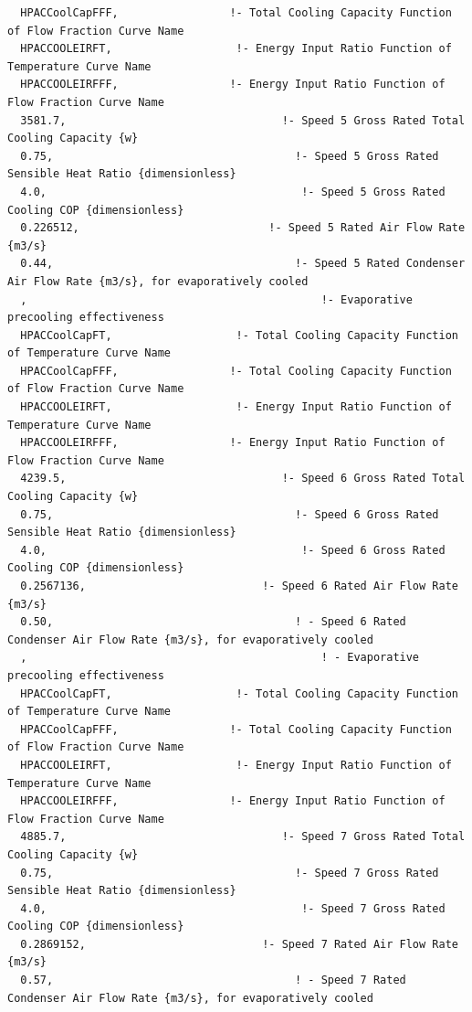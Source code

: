 \begin{lstlisting}
  HPACCoolCapFFF,                 !- Total Cooling Capacity Function of Flow Fraction Curve Name
  HPACCOOLEIRFT,                   !- Energy Input Ratio Function of Temperature Curve Name
  HPACCOOLEIRFFF,                 !- Energy Input Ratio Function of Flow Fraction Curve Name
  3581.7,                                 !- Speed 5 Gross Rated Total Cooling Capacity {w}
  0.75,                                     !- Speed 5 Gross Rated Sensible Heat Ratio {dimensionless}
  4.0,                                       !- Speed 5 Gross Rated Cooling COP {dimensionless}
  0.226512,                             !- Speed 5 Rated Air Flow Rate {m3/s}
  0.44,                                     !- Speed 5 Rated Condenser Air Flow Rate {m3/s}, for evaporatively cooled
  ,                                             !- Evaporative precooling effectiveness
  HPACCoolCapFT,                   !- Total Cooling Capacity Function of Temperature Curve Name
  HPACCoolCapFFF,                 !- Total Cooling Capacity Function of Flow Fraction Curve Name
  HPACCOOLEIRFT,                   !- Energy Input Ratio Function of Temperature Curve Name
  HPACCOOLEIRFFF,                 !- Energy Input Ratio Function of Flow Fraction Curve Name
  4239.5,                                 !- Speed 6 Gross Rated Total Cooling Capacity {w}
  0.75,                                     !- Speed 6 Gross Rated Sensible Heat Ratio {dimensionless}
  4.0,                                       !- Speed 6 Gross Rated Cooling COP {dimensionless}
  0.2567136,                           !- Speed 6 Rated Air Flow Rate {m3/s}
  0.50,                                     ! - Speed 6 Rated Condenser Air Flow Rate {m3/s}, for evaporatively cooled
  ,                                             ! - Evaporative precooling effectiveness
  HPACCoolCapFT,                   !- Total Cooling Capacity Function of Temperature Curve Name
  HPACCoolCapFFF,                 !- Total Cooling Capacity Function of Flow Fraction Curve Name
  HPACCOOLEIRFT,                   !- Energy Input Ratio Function of Temperature Curve Name
  HPACCOOLEIRFFF,                 !- Energy Input Ratio Function of Flow Fraction Curve Name
  4885.7,                                 !- Speed 7 Gross Rated Total Cooling Capacity {w}
  0.75,                                     !- Speed 7 Gross Rated Sensible Heat Ratio {dimensionless}
  4.0,                                       !- Speed 7 Gross Rated Cooling COP {dimensionless}
  0.2869152,                           !- Speed 7 Rated Air Flow Rate {m3/s}
  0.57,                                     ! - Speed 7 Rated Condenser Air Flow Rate {m3/s}, for evaporatively cooled

\end{lstlisting}
